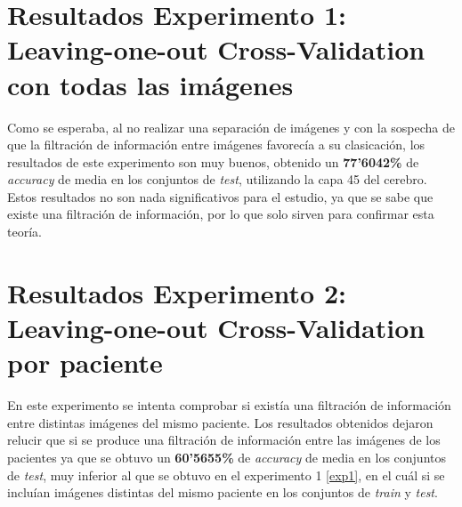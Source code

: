 \section{Resultados Experimento 1: Leaving-one-out Cross-Validation con todas las imágenes}
\label{experimento1-resultados}
Como se esperaba, al no realizar una separación de imágenes y con la sospecha de que la filtración de información entre imágenes favorecía a su clasicación, los resultados de este experimento son muy buenos, obtenido un \textbf{77'6042\%} de \textit{accuracy} de media en los conjuntos de \textit{test}, utilizando la capa 45 del cerebro. Estos resultados no son nada significativos para el estudio, ya que se sabe que existe una filtración de información, por lo que solo sirven para confirmar esta teoría.\\
\section{Resultados Experimento 2: Leaving-one-out Cross-Validation por paciente}
\label{experimento2-resultados}
En este experimento se intenta comprobar si existía una filtración de información entre distintas imágenes del mismo paciente. Los resultados obtenidos dejaron relucir que si se produce una filtración de información entre las imágenes de los pacientes ya que se obtuvo un \textbf{60'5655\%} de \textit{accuracy} de media en los conjuntos de \textit{test}, muy inferior al que se obtuvo en el experimento 1 \ref{exp1}, en el cuál si se incluían imágenes distintas del mismo paciente en los conjuntos de \textit{train} y \textit{test}.\\
